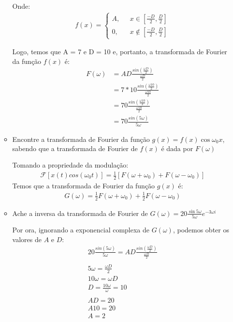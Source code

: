 \documentclass[12pt]{article}
\begin{document}
\begin{itemize}
\begin{itemize}
Onde:
\begin{eqnarray*}
f(x) = \left\{ \begin{array}{rl} 
 A, &\mbox{ $x \in  [\frac{-D}{2}, \frac{D}{2}]$} \\
 0, &\mbox{ $x \notin [\frac{-D}{2}, \frac{D}{2}]$}
       \end{array} \right.
\end{eqnarray*}

Logo, temos que A = 7 e D = 10 e, portanto, a transformada de Fourier da função $f(x)$ é:
\begin{align*}
    F(\omega) &= AD\frac{sin(\frac{\omega D}{2})}{\frac{\omega D}{2}} \\
              &= 7*10\frac{sin(\frac{\omega 10}{2})}{\frac{\omega 10}{2}} \\
              &= 70\frac{sin(\frac{\omega 10}{2})}{\frac{\omega 10}{2}} \\
              &= 70\frac{sin(5\omega)}{5\omega}
\end{align*}

\item Encontre a transformada de Fourier da função $ g(x) = f(x)\cos
   \omega_0 x$, sabendo que a transformada de Fourier de $f(x)$ é dada
   por $F(\omega)$

Tomando a propriedade da modulação:
\begin{align*}
    \mathcal{F}[x(t)cos(\omega_0t)] = \frac{1}{2}[F(\omega + \omega_0) + F(\omega - \omega_0)]
\end{align*}
Temos que a transformada de Fourier da função $g(x)$ é:
\begin{align*}
    G(\omega) = \frac{1}{2}F(\omega + \omega_0) + \frac{1}{2}F(\omega - \omega_0)
\end{align*}

\item Ache a inversa da transformada de Fourier de $G(\omega) =
  20\frac{\sin 5\omega}{5\omega}e^{-3\omega i}$

Por ora, ignorando a exponencial complexa de $G(\omega)$, podemos obter os valores de $A$ e $D$:
\begin{align*}
    20\frac{sin(5\omega)}{5\omega} = AD\frac{sin(\frac{\omega D}{2})}{\frac{\omega D}{2}} \\
    \\ 5\omega = \frac{\omega D}{2} \\
    10\omega = \omega D \\
    D = \frac{10\omega}{\omega} = 10 \\
    \\ AD = 20 \\
    A10 = 20 \\
    A = 2
\end{align*}


\end{itemize}
\end{itemize}
\end{document}
